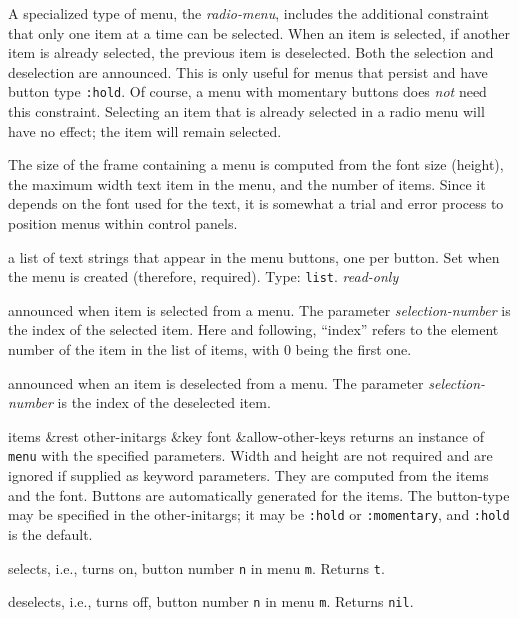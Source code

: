 \documentclass[twoside,openright,11pt]{report}
\newcommand{\tp}[1]{\texttt{#1}}
\begin{document}
A specialized type of menu, the \emph{radio-menu},
includes the additional constraint that only one item at a time can be
selected.  When an item is selected, if another item is already
selected, the previous item is deselected.  Both the selection and
deselection are announced.  This is only useful for menus that persist
and have button type \tp{:hold}.  Of course, a menu with momentary
buttons does \emph{not} need this constraint.  Selecting an item that
is already selected in a radio menu will have no effect; the item will
remain selected.

The size of the frame containing a menu is computed from the font size
(height), the maximum width text item in the menu, and the number of
items.  Since it depends on the font used for the text, it is somewhat
a trial and error process to position menus within control panels.


{a list of text strings that appear in the menu buttons, one per
button.  Set when the menu is created (therefore, required).  Type:
\tp{list}.  \textit{read-only}}


{announced when item is selected from a menu.  The parameter
\textit{selection-number} is the index of the selected item.  Here and
following, ``index'' refers to the element number of the item in the
list of items, with 0 being the first one.}

{announced when an item is deselected from a menu.  The parameter
\textit{selection-number} is the index of the deselected item.}


{items \&rest other-initargs \&key font \&allow-other-keys} {returns
an instance of \tp{menu} with the specified parameters.  Width and
height are not required and are ignored if supplied as keyword
parameters.  They are computed from the items and the font.  Buttons
are automatically generated for the items.  The button-type may be
specified in the other-initargs; it may be \tp{:hold} or
\tp{:momentary}, and \tp{:hold} is the default.}

{selects, i.e., turns on, button number \tp{n} in menu \tp{m}.
Returns \tp{t}.}

{deselects, i.e., turns off, button number \tp{n} in menu
\tp{m}.  Returns \tp{nil}.}
\end{document}

